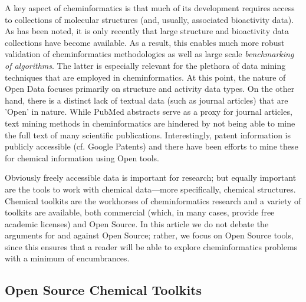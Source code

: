 \documentclass{sig-alternate}
\begin{document}
A key aspect of cheminformatics is that much of its development
requires access to collections of molecular structures (and, usually,
associated bioactivity data). As has been noted, it is only recently
that large structure and bioactivity data collections have become
available. As a result, this enables much more robust validation of
cheminformatics methodologies as well as large scale \emph{benchmarking of
algorithms}. The latter is especially relevant for the plethora of
data mining techniques that are employed in cheminformatics. At this
point, the nature of Open Data focuses primarily on structure and
activity data types. On the other hand, there is a distinct lack of
textual data (such as journal articles) that are 'Open' in nature. While
PubMed abstracts serve as a proxy for journal articles, text mining
methods in cheminformatics are hindered by not being able to mine the full text of many scientific publications.
Interestingly, patent information is publicly accessible (cf. Google
Patents) and there have been efforts to mine these for chemical
information using Open tools.

Obviously freely accessible data is important for research; but
equally important are the tools to work with chemical data---more
specifically, chemical structures. Chemical toolkits are the workhorses
of cheminformatics research and a variety of toolkits are available,
both commercial (which, in many cases, provide free academic
licenses) and Open Source. In this article we do not debate the
arguments for and against Open Source; rather, we focus on Open Source
tools, since this ensures that a reader will be able to explore
cheminformatics problems with a minimum of encumbrances.

\subsection{Open Source Chemical Toolkits}
\label{sec:toolkits}
\end{document}
